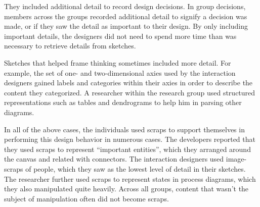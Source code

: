 They included additional detail to record design decisions. In group decisions, members across the groups recorded additional detail to signify a decision was made, or if they saw the detail as important to their design. By only including important details, the designers did not need to spend more time than was necessary to retrieve details from sketches. 

Sketches that helped frame thinking sometimes included more detail. For example, the set of one- and two-dimensional axies used by the interaction designers gained labels and categories within their axies in order to describe the content they categorized. A researcher within the research group used structured representations such as tables and dendrograms to help him in parsing other diagrams.

In all of the above cases, the individuals used scraps to support themselves in performing this design behavior in numerous cases. The developers reported that they used scraps to represent ``important entities'', which they arranged around the canvas and related with connectors. The interaction designers used image-scraps of people, which they saw as the lowest level of detail in their sketches. The researcher further used scraps to represent states in process diagrams, which they also manipulated quite heavily. Across all groups, content that wasn't the subject of manipulation often did not become scraps.

%
%
%
%
%
%
%
%

